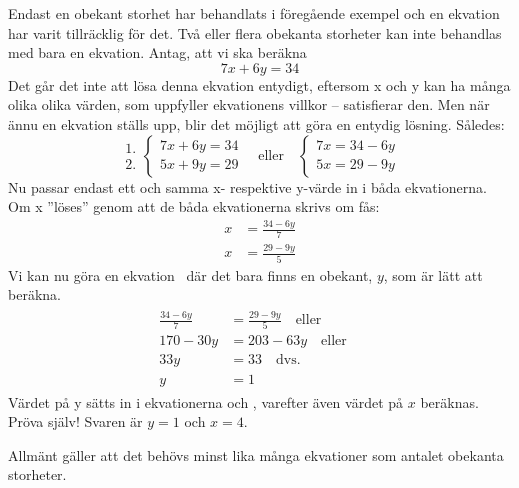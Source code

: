 Endast en obekant storhet har behandlats i föregående exempel och en ekvation
har varit tillräcklig för det.
Två eller flera obekanta storheter kan inte behandlas med bara en ekvation.
Antag, att vi ska beräkna
\[7x+6y=34\]
Det går det inte att lösa denna ekvation entydigt, eftersom x och y kan ha många
olika olika värden, som uppfyller ekvationens villkor -- satisfierar den.
Men när ännu en ekvation ställs upp, blir det möjligt att göra en entydig
lösning.
Således:
\[
\begin{array}{c}
1.\\2.
\end{array}
\left\{
\begin{array}{l}
7x + 6y = 34\\
5x + 9y = 29
\end{array}
\right.
\quad \text{eller} \quad
\left\{
\begin{array}{l}
7x = 34 - 6y\\
5x = 29 - 9y 
\end{array}
\right. 
\]
Nu passar endast ett och samma x- respektive y-värde in i båda ekvationerna.
Om x ''löses'' genom att de båda ekvationerna skrivs om fås:
\begin{align}
  \label{eq:1}
  x &= \frac{34-6y}{7}\\
  \label{eq:2}
  x &= \frac{29-9y}{5}
\end{align}
Vi kan nu göra en ekvation~ där det bara finns en obekant, \(y\),
som är lätt att beräkna.
\begin{align}
  \begin{split}
    \label{eq:3}
    \frac{34 - 6y}{7} &= \frac{29 - 9y}{5}
    \quad \text{eller} \\
    170 - 30y &= 203-63y
    \quad \text{eller} \quad \\
    33y &= 33
    \quad \text{dvs.} \quad \\
    y &= 1
  \end{split}
\end{align}
Värdet på y sätts in i ekvationerna  och , varefter
även värdet på \(x\) beräknas.
Pröva själv! Svaren är \(y = 1\) och \(x = 4\).

Allmänt gäller att det behövs minst lika många ekvationer som antalet obekanta
storheter.

